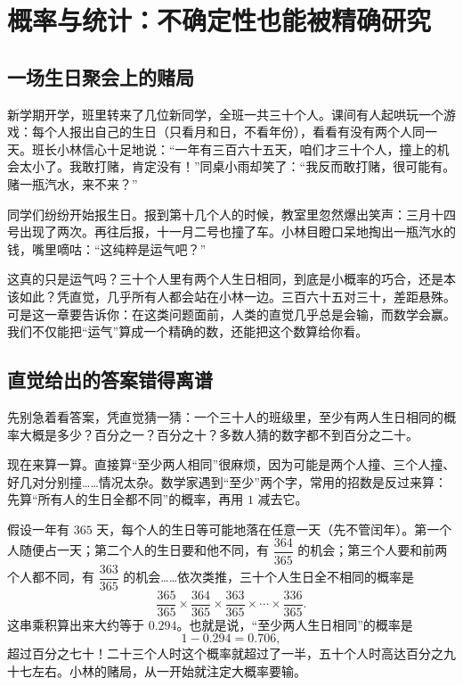 \chapter{概率与统计：不确定性也能被精确研究}

\section{一场生日聚会上的赌局}

新学期开学，班里转来了几位新同学，全班一共三十个人。课间有人起哄玩一个游戏：每个人报出自己的生日（只看月和日，不看年份），看看有没有两个人同一天。班长小林信心十足地说：“一年有三百六十五天，咱们才三十个人，撞上的机会太小了。我敢打赌，肯定没有！”同桌小雨却笑了：“我反而敢打赌，很可能有。赌一瓶汽水，来不来？”

同学们纷纷开始报生日。报到第十几个人的时候，教室里忽然爆出笑声：三月十四号出现了两次。再往后报，十一月二号也撞了车。小林目瞪口呆地掏出一瓶汽水的钱，嘴里嘀咕：“这纯粹是运气吧？”

这真的只是运气吗？三十个人里有两个人生日相同，到底是小概率的巧合，还是本该如此？凭直觉，几乎所有人都会站在小林一边。三百六十五对三十，差距悬殊。可是这一章要告诉你：在这类问题面前，人类的直觉几乎总是会输，而数学会赢。我们不仅能把“运气”算成一个精确的数，还能把这个数算给你看。

\section{直觉给出的答案错得离谱}

先别急着看答案，凭直觉猜一猜：一个三十人的班级里，至少有两人生日相同的概率大概是多少？百分之一？百分之十？多数人猜的数字都不到百分之二十。

现在来算一算。直接算“至少两人相同”很麻烦，因为可能是两个人撞、三个人撞、好几对分别撞……情况太杂。数学家遇到“至少”两个字，常用的招数是反过来算：先算“所有人的生日全都不同”的概率，再用 $1$ 减去它。

假设一年有 $365$ 天，每个人的生日等可能地落在任意一天（先不管闰年）。第一个人随便占一天；第二个人的生日要和他不同，有 $\dfrac{364}{365}$ 的机会；第三个人要和前两个人都不同，有 $\dfrac{363}{365}$ 的机会……依次类推，三十个人生日全不相同的概率是
\[
\frac{365}{365}\times\frac{364}{365}\times\frac{363}{365}\times\cdots\times\frac{336}{365}.
\]
这串乘积算出来大约等于 $0.294$。也就是说，“至少两人生日相同”的概率是
\[
1-0.294=0.706,
\]
超过百分之七十！二十三个人时这个概率就超过了一半，五十个人时高达百分之九十七左右。小林的赌局，从一开始就注定大概率要输。

